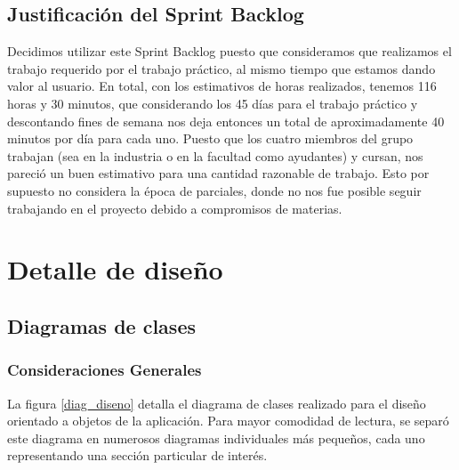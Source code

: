 \documentclass[10pt, a4paper,english,spanish]{article}
\begin{document}


\subsection{Justificación del Sprint Backlog}

Decidimos utilizar este Sprint Backlog puesto que consideramos que realizamos el trabajo requerido por el trabajo práctico, al mismo tiempo que estamos dando valor al usuario. En total, con los estimativos de horas realizados, tenemos 116 horas y 30 minutos,  que considerando los 45 días para el trabajo práctico y descontando fines de semana nos deja entonces un total de aproximadamente 40 minutos por día para cada uno. Puesto que los cuatro miembros del grupo trabajan (sea en la industria o en la facultad como ayudantes) y cursan, nos pareció un buen estimativo para una cantidad razonable de trabajo. Esto por supuesto no considera la época de parciales, donde no nos fue posible seguir trabajando en el proyecto debido a compromisos de materias.

\section{Detalle de diseño}

\subsection{Diagramas de clases}

\subsubsection{Consideraciones Generales}
La figura \ref{diag_diseno} detalla el diagrama de clases realizado para el diseño orientado a objetos de la aplicación. Para mayor comodidad de lectura, se separó este diagrama en numerosos diagramas individuales más pequeños, cada uno representando una sección particular de interés.
\end{document}
